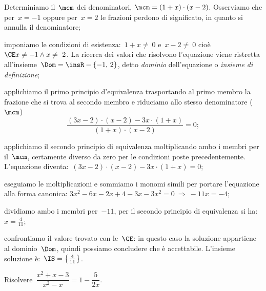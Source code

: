 \begin{exrig}
\begin{enumeratea}
 \item Determiniamo il~$\mcm$ dei denominatori, $\mcm=(1+x)\cdot (x-2)$.
    Osserviamo che per~$x = -1$ oppure per~$x = 2$ le frazioni perdono di significato, in quanto si annulla il denominatore;
 \item imponiamo le condizioni di esistenza:~$1+x\neq~0$ e~$x-2\neq~0$ cioè~$\CE x\neq -1\wedge x\neq~2$. La ricerca dei valori
    che risolvono l'equazione viene ristretta all'insieme~$\Dom=\insR-\{-1\text{,~}2\}$, detto \emph{dominio} dell'equazione o
    \emph{insieme di definizione};
 \item applichiamo il primo principio d'equivalenza trasportando al primo membro la frazione che si trova al secondo membro
    e riduciamo allo stesso denominatore ($\mcm$)
    \begin{equation*}
      \frac{(3x-2)\cdot (x-2)-3x\cdot (1+x)}{(1+x)\cdot (x-2)}=0;
    \end{equation*}
 \item applichiamo il secondo principio di equivalenza moltiplicando ambo i membri per il~$\mcm$,
    certamente diverso da zero per le condizioni poste precedentemente. L'equazione diventa:~$(3x-2)\cdot (x-2)-3x\cdot (1+x)=0$;
 \item eseguiamo le moltiplicazioni e sommiamo i monomi simili per portare l'equazione alla forma canonica:
    $3x^{2}-6x-2x+4-3x-3x^{2}=0\: \Rightarrow\: -11x=-4$;
 \item dividiamo ambo i membri per~$-11$, per il secondo principio di equivalenza si ha:~$x=\frac{4}{11}$;
 \item confrontiamo il valore trovato con le~$\CE$: in questo caso la soluzione appartiene al dominio~$\Dom$, quindi possiamo concludere
    che è accettabile. L'insieme soluzione è:~$\IS=\left\{\frac{4}{11}\right\}$.
\end{enumeratea}

 \begin{esempio}
Risolvere~$\dfrac{x^{2}+x-3}{x^{2}-x}=1-\dfrac{5}{2x}$.
\end{esempio}


\end{exrig}
